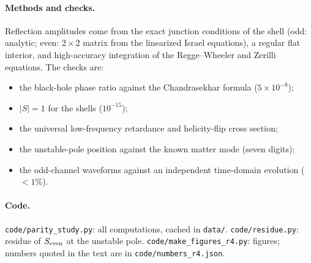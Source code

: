 \paragraph{Methods and checks.} Reflection amplitudes come from the exact junction conditions of the shell (odd: analytic;
even: $2\times2$ matrix from the linearized Israel equations), a regular flat interior, and high-accuracy integration of the
Regge--Wheeler and Zerilli equations. The checks are:
\begin{itemize}
\item the black-hole phase ratio against the Chandrasekhar formula ($5\times10^{-8}$);
\item $|S|=1$ for the shells ($10^{-15}$);
\item the universal low-frequency retardance and helicity-flip cross section;
\item the unstable-pole position against the known matter mode (seven digits);
\item the odd-channel waveforms against an independent time-domain evolution ($<1\%$).
\end{itemize}

\paragraph{Code.} \texttt{code/parity\_study.py}: all computations, cached in \texttt{data/}. \texttt{code/residue.py}:
residue of $S_{\rm even}$ at the unstable pole. \texttt{code/make\_figures\_r4.py}: figures; numbers quoted in the text are in
\texttt{code/numbers\_r4.json}.
